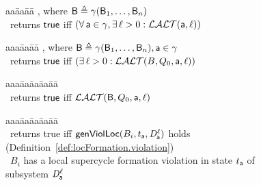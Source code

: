 \begin{figure}%
\setcounter{lctr}{0}
\begin{tabbing}\label{alg:check.LAO}
aa\= aa\= aa\= \kill
{},  where $\mathsf{B} \triangleq \gamma(\mathsf{B}_1,\dots,\mathsf{B}_n)$\\
\cmnt\ returns $\mathsf{true}$ iff $(\forall\, \mathsf{a} \in \gamma, \exists\, \ell > 0: \mathcal{LALT}(\mathsf{a}, \ell))$\\
\lio{\ENDFOR;}
\end{tabbing}

\setcounter{lctr}{0}
\begin{tabbing}\label{alg:check.LAO.Int}
aaa\= aa\= aa\= \kill
{},  where $\mathsf{B} \triangleq \gamma(\mathsf{B}_1,\dots,\mathsf{B}_n), \mathsf{a} \in \gamma$\\
\cmnt\ returns $\mathsf{true}$ iff $(\exists\, \ell > 0: \mathcal{LALT}(B, Q_0, \mathsf{a}, \ell))$\\
\lio{\WHILEC{\ttt}}
\lion{\ENDWHILE}
\end{tabbing}

\setcounter{lctr}{0}
\begin{tabbing}
\label{alg:eval-ldfc}
aaa\= aa\= aa\= aa\= aa\=\kill
{}\\
\cmnt\ returns $\mathsf{true}$ iff $\mathcal{LALT}(\mathsf{B}, Q_0, \mathsf{a}, \ell)$\\
   \lit{\ENDFOR}
\lio{\ENDFOR}
\end{tabbing}



\setcounter{lctr}{0}
\begin{tabbing}
\label{alg:computeLocForm}
aaa\= aa\= aa\= aa\= aa\=\kill
{}\\
\cmnt\ returns true iff $\mathsf{genViolLoc}(B_i,t_{\mathsf{a}},\mathit{D}_{\mathsf{a}}^{\ell})$ holds (Definition~\ref{def:locFormation.violation})\\
\cmnt\ \ie $B_i$ has a local supercycle formation violation in state $t_{\mathsf{a}}$ of subsystem $\mathit{D}_{\mathsf{a}}^{\ell}$\\
\end{tabbing}



\end{figure}
